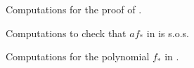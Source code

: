 \documentclass[a4paper,twoside,reqno]{amsart}
\theoremstyle{plain}
\theoremstyle{definition}
\theoremstyle{remark}
\begin{document}
\begin{figure}[ht]

\caption{Computations for the proof of .\label{fig:test}}
\end{figure}

\begin{figure}[ht]

\caption{Computations to check that $af_*$ in  is s.o.s.
\label{fig:af_sos}}
\end{figure}

\begin{figure}[ht]

\caption{Computations for the polynomial $f_*$ in .
\label{fig:transform}}
\end{figure}
\end{document}
